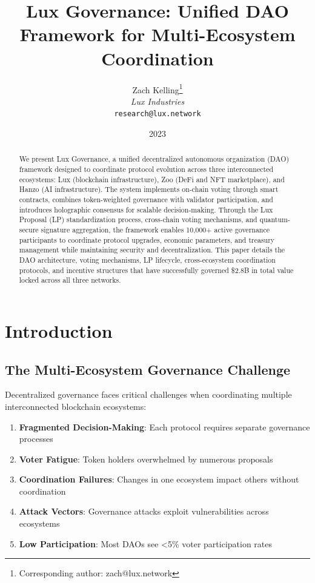 \documentclass[11pt,a4paper]{article}
\title{Lux Governance: Unified DAO Framework for Multi-Ecosystem Coordination}
\author{
Zach Kelling\thanks{Corresponding author: zach@lux.network}\\
\textit{Lux Industries}\\
\texttt{research@lux.network}
}
\date{2023}
\begin{document}
\luxcoverpage
\maketitle
\begin{abstract}
We present Lux Governance, a unified decentralized autonomous organization (DAO) framework designed to coordinate protocol evolution across three interconnected ecosystems: Lux (blockchain infrastructure), Zoo (DeFi and NFT marketplace), and Hanzo (AI infrastructure). The system implements on-chain voting through smart contracts, combines token-weighted governance with validator participation, and introduces holographic consensus for scalable decision-making. Through the Lux Proposal (LP) standardization process, cross-chain voting mechanisms, and quantum-secure signature aggregation, the framework enables 10,000+ active governance participants to coordinate protocol upgrades, economic parameters, and treasury management while maintaining security and decentralization. This paper details the DAO architecture, voting mechanisms, LP lifecycle, cross-ecosystem coordination protocols, and incentive structures that have successfully governed \$2.8B in total value locked across all three networks.
\end{abstract}


\luxcoverpage
\maketitle

\section{Introduction}

\subsection{The Multi-Ecosystem Governance Challenge}

Decentralized governance faces critical challenges when coordinating multiple interconnected blockchain ecosystems:

\begin{enumerate}
\item \textbf{Fragmented Decision-Making}: Each protocol requires separate governance processes
\item \textbf{Voter Fatigue}: Token holders overwhelmed by numerous proposals
\item \textbf{Coordination Failures}: Changes in one ecosystem impact others without coordination
\item \textbf{Attack Vectors}: Governance attacks exploit vulnerabilities across ecosystems
\item \textbf{Low Participation}: Most DAOs see <5\% voter participation rates
\end{enumerate}
\end{document}
